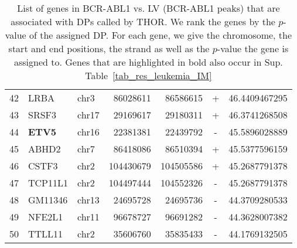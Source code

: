 \begin{table}
\begin{tabular}{rllrrcr}
42 & LRBA & chr3 & 86028611 & 86586615 & + & 46.4409467295 \\
43 & SRSF3 & chr17 & 29169617 & 29180311 & + & 46.3741268508 \\
44 & \textbf{ETV5} & chr16 & 22381381 & 22439792 & - & 45.5896028889 \\
45 & ABHD2 & chr7 & 86418086 & 86510394 & + & 45.5377596159 \\
46 & CSTF3 & chr2 & 104430679 & 104505586 & + & 45.2687791378 \\
47 & TCP11L1 & chr2 & 104497444 & 104552326 & - & 45.2687791378 \\
48 & GM11346 & chr13 & 24695728 & 24695736 & - & 44.3709280533 \\
49 & NFE2L1 & chr11 & 96678727 & 96691282 & - & 44.3628007382 \\
50 & TTLL11 & chr2 & 35606760 & 35835433 & - & 44.1769132505 \\
 \end{tabular}
\caption[List of genes associated with DP-LV]{List of genes in BCR-ABL1 vs. LV (BCR-ABL1 peaks) that are associated with DPs called by THOR.
We rank the genes by the $p$-value of the assigned DP.
For each gene, we give the chromosome, the start and end positions, the strand as well as the $p$-value the gene is assigned to.
Genes that are highlighted in bold also occur in Sup. Table~\ref{tab_res_leukemia_IM}}
\label{tab_res_leukemia_LV}
\end{table}




